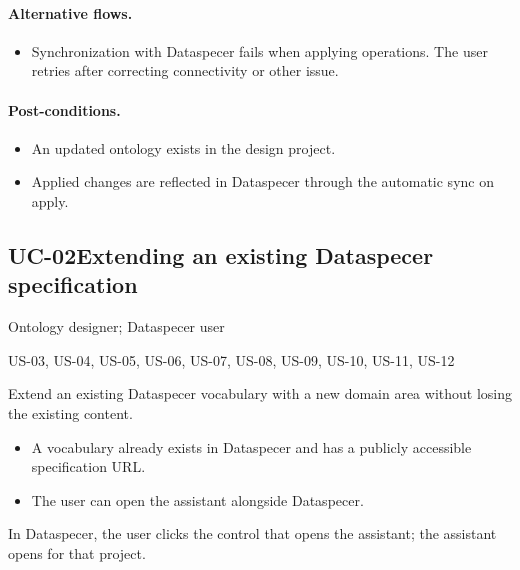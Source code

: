 \documentclass{article}
\begin{document}
\paragraph*{Alternative flows.}
\begin{itemize}
  \item[7a.] Synchronization with Dataspecer fails when applying operations. The user retries after correcting connectivity or other issue.
\end{itemize}

\paragraph*{Post-conditions.}
\begin{itemize}
  \item An updated ontology exists in the design project.
  \item Applied changes are reflected in Dataspecer through the automatic sync on apply.
\end{itemize}

\subsection{UC-02\quad Extending an existing Dataspecer specification}
\label{sec:uc-02}

\begin{description}[leftmargin=3.8cm,style=nextline]
  \item[Actors] Ontology designer; Dataspecer user
  \item[Based on user stories] US-03, US-04, US-05, US-06, US-07, US-08, US-09, US-10, US-11, US-12
  \item[Goal] Extend an existing Dataspecer vocabulary with a new domain area without losing the existing content.
  \item[Pre-conditions]
    \begin{itemize}
      \item A vocabulary already exists in Dataspecer and has a publicly accessible specification URL.
      \item The user can open the assistant alongside Dataspecer.
    \end{itemize}
  \item[Trigger] In Dataspecer, the user clicks the control that opens the assistant; the assistant opens for that project.
\end{description}
\end{document}
